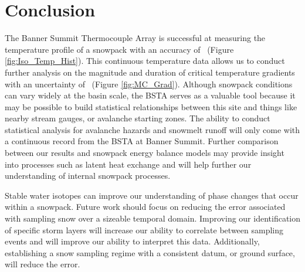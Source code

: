 \chapter{Conclusion}

The Banner Summit Thermocouple Array is successful at measuring the temperature profile of a snowpack with an accuracy of \isostd \ (Figure \ref{fig:Iso_Temp_Hist}). This continuous temperature data allows us to conduct further analysis on the magnitude and duration of critical temperature gradients with an uncertainty of \gradstd \ (Figure \ref{fig:MC_Grad}). Although snowpack conditions can vary widely at the basin scale, the BSTA serves as a valuable tool because it may be possible to build statistical relationships between this site and things like nearby stream gauges, or avalanche starting zones. The ability to conduct statistical analysis for avalanche hazards and snowmelt runoff will only come with a continuous record from the BSTA at Banner Summit. Further comparison between our results and snowpack energy balance models may provide insight into processes such as latent heat exchange and will help further our understanding of internal snowpack processes. 

Stable water isotopes can improve our understanding of phase changes that occur within a snowpack. Future work should focus on reducing the error associated with sampling snow over a sizeable temporal domain. Improving our identification of specific storm layers will increase our ability to correlate between sampling events and will improve our ability to interpret this data. Additionally, establishing a snow sampling regime with a consistent datum, or ground surface, will reduce the error.   